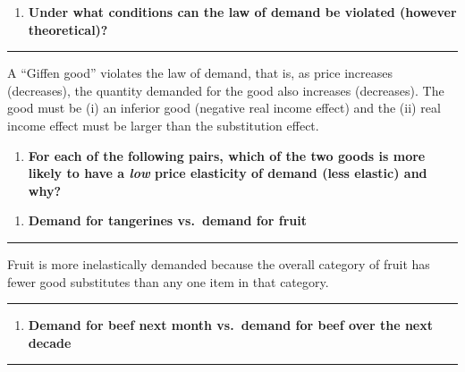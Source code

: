 \documentclass[
  11pt,
]{article}
\providecommand{\tightlist}{%
  \setlength{\itemsep}{0pt}\setlength{\parskip}{0pt}}
\begin{document}
\begin{enumerate}
\def\labelenumi{\arabic{enumi}.}
\setcounter{enumi}{1}
\tightlist
\item
  \textbf{Under what conditions can the law of demand be violated
  (however theoretical)?}
\end{enumerate}

\begin{center}\rule{0.5\linewidth}{0.5pt}\end{center}

A ``Giffen good'' violates the law of demand, that is, as price
increases (decreases), the quantity demanded for the good also increases
(decreases). The good must be (i) an inferior good (negative real income
effect) and the (ii) real income effect must be larger than the
substitution effect.

\clearpage

\begin{enumerate}
\def\labelenumi{\arabic{enumi}.}
\setcounter{enumi}{2}
\tightlist
\item
  \textbf{For each of the following pairs, which of the two goods is
  more likely to have a \emph{low} price elasticity of demand (less
  elastic) and why?}
\end{enumerate}

\begin{enumerate}
\def\labelenumi{\alph{enumi}.}
\tightlist
\item
  \textbf{Demand for tangerines vs.~demand for fruit}
\end{enumerate}

\begin{center}\rule{0.5\linewidth}{0.5pt}\end{center}

Fruit is more inelastically demanded because the overall category of
fruit has fewer good substitutes than any one item in that category.

\begin{center}\rule{0.5\linewidth}{0.5pt}\end{center}

\begin{enumerate}
\def\labelenumi{\alph{enumi}.}
\setcounter{enumi}{1}
\tightlist
\item
  \textbf{Demand for beef next month vs.~demand for beef over the next
  decade}
\end{enumerate}

\begin{center}\rule{0.5\linewidth}{0.5pt}\end{center}
\end{document}
